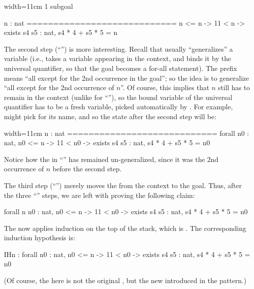 \begin{coqout}{}{width=11cm}
1 subgoal

  n : nat
  ============================
  n <= n -> 11 < n -> exists s4 s5 : nat, s4 * 4 + s5 * 5 = n
\end{coqout}

The second step (``'') is more interesting. Recall
that  usually ``generalizes'' a variable (i.e., takes a
variable appearing in the context, and binds it by the universal
quantifier, so that the goal becomes a for-all statement). The prefix
 means ``all except for the 2nd occurrence in the goal''; so
the idea is
to generalize ``all except for the 2nd occurrence of $n$''. Of course,
this implies that $n$ still has to remain in the context (unlike for
``''), so the
bound variable of the universal quantifier has to be a fresh
variable, picked automatically by \Coq{}. For example, \Coq{} might
pick  for its name, and so the state after the second step will
be:

\begin{coqout}{}{width=11cm}
  n : nat
  ============================
  forall n0 : nat,
  n0 <= n -> 11 < n0 -> exists s4 s5 : nat, s4 * 4 + s5 * 5 = n0
\end{coqout}

Notice how the  in ``'' has remained un-generalized,
since it was the 2nd occurrence of $n$ before the second step.

The third step (``'') merely moves the  from the
context to the goal. Thus, after the three ``'' steps, we are
left with proving the following claim:

\begin{coq}{}{}
forall n n0 : nat,
  n0 <= n -> 11 < n0 -> exists s4 s5 : nat, s4 * 4 + s5 * 5 = n0
\end{coq}

The  now applies induction on the top of the stack, which
is . The corresponding induction hypothesis  is:

\begin{coq}{}{}
IHn : forall n0 : nat,
      n0 <= n ->
      11 < n0 -> exists s4 s5 : nat, s4 * 4 + s5 * 5 = n0
\end{coq}

(Of course, the  here is not the original , but the new
 introduced in the \C{=>[|n IHn]} pattern.)

